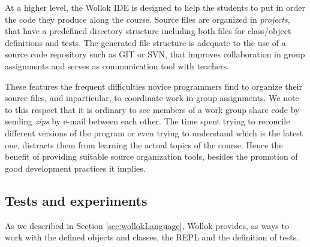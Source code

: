 \medskip
At a higher level, the Wollok IDE is designed to help the students to put in order the code they produce along the course. 
Source files are organized in \emph{projects}, that have a predefined directory structure including both files for class/object definitions and tests.
The generated file structure is adequate to the use of a source code repository such as GIT or SVN, that improves collaboration in group assignments and serves as communication tool with teachers.

These features the frequent difficulties novice programmers find to organize their source files, and inparticular, to coordinate work in group assignments.
We note to this respect that it is ordinary to see members of a work group share code by sending \emph{zips} by e-mail between each other.
The time spent trying to reconcile different versions of the program or even trying to understand which is the latest one, distracts them from learning the actual topics of the course.
Hence the benefit of providing suitable source organization tools, besides the promotion of good development practices it implies.

%

\subsection{Tests and experiments}
As we described in Section \ref{sec:wollokLanguage}, Wollok provides, as ways to work with the defined objects and classes, the REPL and the definition of tests.

